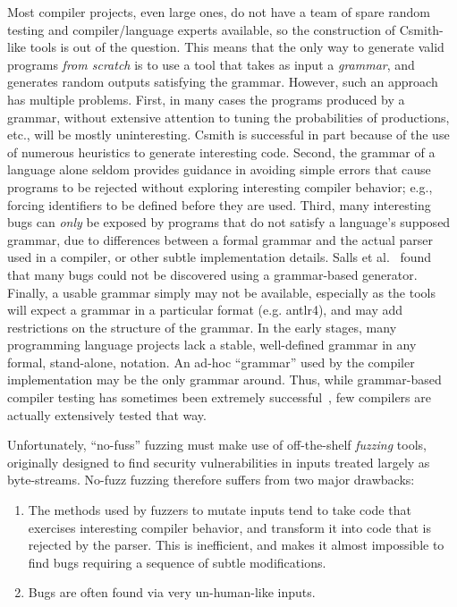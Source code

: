 \begin{sloppypar}
 Most compiler projects, even large ones, do not have a team
of spare random testing and compiler/language experts available, so the construction of
Csmith-like tools is out of the question.  This means that the only
way to generate valid programs \emph{from scratch} is to use a tool that takes as
input a \emph{grammar}, and generates random outputs
satisfying the grammar.   However, such an approach has multiple problems.
First, in many cases the programs produced by a grammar, without
extensive attention to tuning the probabilities of productions, etc., will be mostly uninteresting.
Csmith is successful in part because of the use of numerous heuristics
to generate interesting code.  Second, the grammar of a language alone
seldom provides guidance in avoiding simple errors that cause programs
to be rejected without exploring interesting compiler behavior; e.g., forcing identifiers to be
defined before they are used.  Third, many interesting bugs can \emph{only}
be exposed by programs that do not satisfy a language's supposed grammar, due to differences between a formal grammar and the actual
parser used in a compiler, or other subtle implementation details.
Salls et al.~\cite{Salls2021TokenLevel} found that many bugs could not be discovered using a
grammar-based generator.
Finally, a usable grammar simply may not be available, especially as the
tools will expect a grammar in a particular format (e.g. antlr4), and may add
restrictions on the structure of the grammar.  In the early stages,
many programming language projects lack a stable, well-defined
grammar in any formal, stand-alone, notation.  An ad-hoc ``grammar'' used by the compiler implementation may be the
only grammar around.  Thus, while grammar-based compiler
testing has sometimes been extremely successful~\cite{LangFuzz}, few compilers are actually
extensively tested that way.
\end{sloppypar}

Unfortunately, ``no-fuss''
fuzzing must make use of off-the-shelf \emph{fuzzing} tools,
originally designed to find security vulnerabilities in inputs treated
largely as byte-streams.  No-fuzz
fuzzing therefore
suffers from two major drawbacks:

\begin{enumerate}
\item The methods used by fuzzers to mutate inputs tend to take code that exercises interesting
  compiler behavior, and transform it into code that is rejected by
  the parser.  This is inefficient, and makes it
  almost impossible to find bugs requiring a sequence of subtle
  modifications.
  \item Bugs are often
    found via very un-human-like inputs.
  \end{enumerate}


